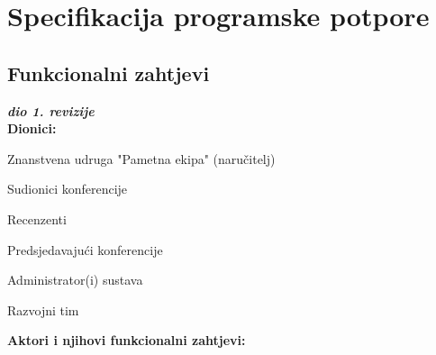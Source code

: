 \chapter{Specifikacija programske potpore}
		
	\section{Funkcionalni zahtjevi}
			
			\textbf{\textit{dio 1. revizije}}\\
			
			
			\noindent \textbf{Dionici:}
			
			\begin{packed_enum}
				
				\item Znanstvena udruga "Pametna ekipa" (naručitelj)
				\item Sudionici konferencije
				\item Recenzenti
				\item Predsjedavajući konferencije				
				\item Administrator(i) sustava
				\item Razvojni tim
				
			\end{packed_enum}
			
			\noindent \textbf{Aktori i njihovi funkcionalni zahtjevi:}
			
